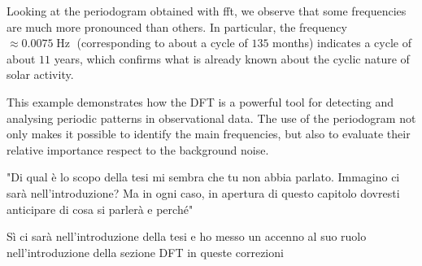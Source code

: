 \noindent Looking at the periodogram obtained with \gls{fft}, we observe that some frequencies are much more pronounced than others. In particular, the frequency $\approx 0.0075\operatorname{\mathrm{Hz}}$ (corresponding to about a cycle of $135$ months) indicates a cycle of about $11$ years, which confirms what is already known about the cyclic nature of solar activity.

\noindent This example demonstrates how the DFT is a powerful tool for detecting and analysing periodic patterns in observational data. The use of the periodogram not only makes it possible to identify the main frequencies, but also to evaluate their relative importance respect to the background noise.

\begin{note}
	"Di qual è lo scopo della tesi mi sembra che tu non abbia parlato. Immagino ci sarà nell'introduzione? Ma in ogni caso, in apertura di questo capitolo dovresti anticipare di cosa si parlerà e perché"

	\bigskip \noindent Sì ci sarà nell'introduzione della tesi e ho messo un accenno al suo ruolo nell'introduzione della sezione DFT in queste correzioni
\end{note}
